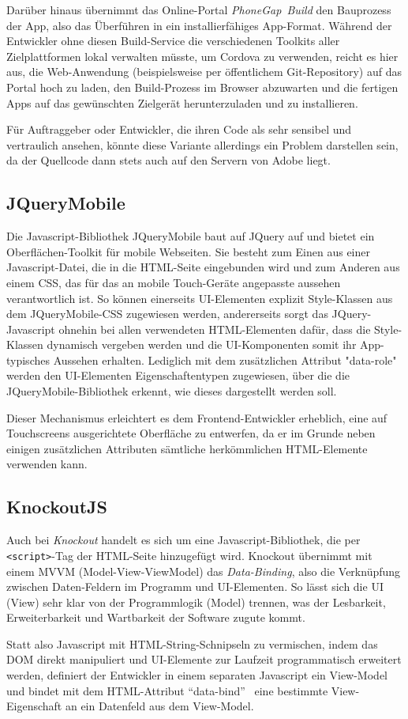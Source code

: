 Darüber hinaus übernimmt das Online-Portal \emph{PhoneGap~Build} den Bauprozess der App, also das Überführen in ein installierfähiges App-Format. 
Während der Entwickler ohne diesen Build-Service die verschiedenen Toolkits aller Zielplattformen lokal verwalten müsste, um Cordova zu verwenden,\cite{pg-doc-1} reicht es hier aus, die Web-Anwendung (beispielsweise per öffentlichem Git-Repository) auf das Portal hoch zu laden, den Build-Prozess im Browser abzuwarten und die fertigen Apps auf das gewünschten Zielgerät herunterzuladen und zu installieren. 

Für Auftraggeber oder Entwickler, die ihren Code als sehr sensibel und vertraulich ansehen, könnte diese Variante allerdings ein Problem darstellen sein, da der Quellcode dann stets auch auf den Servern von Adobe liegt.

\subsection{JQueryMobile}
Die Javascript-Bibliothek JQueryMobile baut auf JQuery auf und bietet ein Oberflächen-Toolkit für mobile Webseiten. Sie besteht zum Einen aus einer Javascript-Datei, die in die HTML-Seite eingebunden wird und zum Anderen aus einem CSS, das für das an mobile Touch-Geräte angepasste aussehen verantwortlich ist. 
So können einerseits UI-Elementen explizit Style-Klassen aus dem JQueryMobile-CSS zugewiesen werden, andererseits sorgt das JQuery-Javascript ohnehin bei allen verwendeten HTML-Elementen dafür, dass die Style-Klassen dynamisch vergeben werden und die UI-Komponenten somit ihr App-typisches Aussehen erhalten.
Lediglich mit dem zusätzlichen Attribut "data-role" werden den UI-Elementen Eigenschaftentypen zugewiesen, über die die JQueryMobile-Bibliothek erkennt, wie dieses dargestellt werden soll.

Dieser Mechanismus erleichtert es dem Frontend-Entwickler erheblich, eine auf Touchscreens ausgerichtete Oberfläche zu entwerfen, da er im Grunde neben einigen zusätzlichen Attributen sämtliche herkömmlichen HTML-Elemente verwenden kann. 

\subsection{KnockoutJS}
Auch bei \emph{Knockout} handelt es sich um eine Javascript-Bibliothek, die per \mbox{\texttt{<script>}-Tag} der HTML-Seite hinzugefügt wird. Knockout übernimmt mit einem MVVM (Model-View-ViewModel) das \emph{Data-Binding}, also die Verknüpfung zwischen Daten-Feldern im Programm und UI-Elementen.
So lässt sich die UI (View) sehr klar von der Programmlogik (Model) trennen, was der Lesbarkeit, Erweiterbarkeit und Wartbarkeit der Software zugute kommt.

Statt also Javascript mit HTML-String-Schnipseln zu vermischen, indem das DOM direkt manipuliert und UI-Elemente zur Laufzeit
programmatisch erweitert werden, definiert der Entwickler in einem separaten Javascript ein View-Model und bindet mit dem HTML-Attribut \enquote{data-bind} \ eine bestimmte View-Eigenschaft an ein Datenfeld aus dem View-Model.
